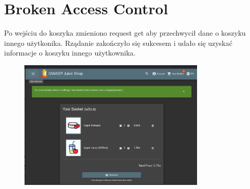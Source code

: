 \documentclass{article}
\begin{document}
\section*{Broken Access Control}
Po wejściu do koszyka zmieniono request get aby przechwycił dane o koszyku innego użytkonika. Rządanie zakończyło się sukcesem i udało się uzyskać informacje o koszyku innego użytkownika.
\begin{figure}[H]
    \centering
    \includegraphics[width=0.8\textwidth]{basket.png}
\end{figure}
\end{document}
